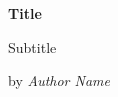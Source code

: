 \documentclass[../main.tex]{subfiles}
\begin{document}
    \begin{titlepage}
        \pagestyle{empty}  \centering

        \huge\textbf{Title} 
        \par\vspace{.125cm}

        \Large{Subtitle} 
        \\  \par
        \vfill

        \Large by \textit{Author Name} \par\vspace{.5mm}

        \newpage
        \tableofcontents
    \end{titlepage}
\end{document}
